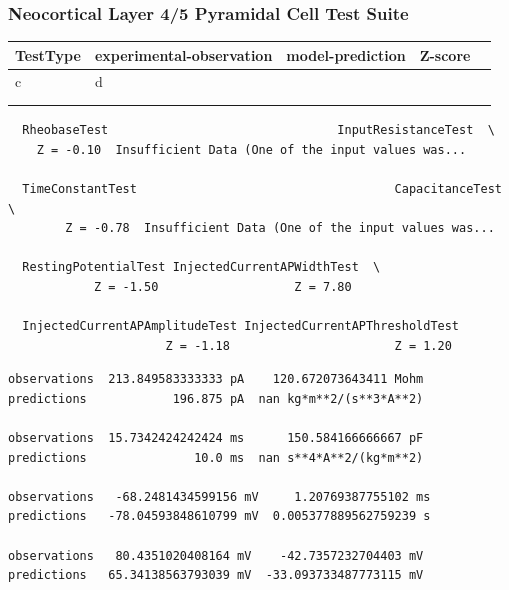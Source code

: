 \subsubsection{Neocortical Layer 4/5 Pyramidal Cell Test
Suite}\label{neocortical-layer-45-pyramidal-cell-test-suite}

\begin{table}[]
\begin{tabular}{|l|l|l|l|l|}
\hline
TestType & experimental-observation & model-prediction& Z-score &  \\ \hline
c & d &  &  &  \\ \hline
  &   &  &  &  \\ \hline
  &   &  &  &  \\ \hline
\end{tabular}
\end{table}    
    
    \begin{verbatim}
  RheobaseTest                                InputResistanceTest  \
    Z = -0.10  Insufficient Data (One of the input values was...   

  TimeConstantTest                                    CapacitanceTest  \
        Z = -0.78  Insufficient Data (One of the input values was...   

  RestingPotentialTest InjectedCurrentAPWidthTest  \
            Z = -1.50                   Z = 7.80   

  InjectedCurrentAPAmplitudeTest InjectedCurrentAPThresholdTest  
                      Z = -1.18                       Z = 1.20  
    \end{verbatim}

    
    
    \begin{verbatim}
observations  213.849583333333 pA    120.672073643411 Mohm   
predictions            196.875 pA  nan kg*m**2/(s**3*A**2)   

observations  15.7342424242424 ms      150.584166666667 pF   
predictions               10.0 ms  nan s**4*A**2/(kg*m**2)   

observations   -68.2481434599156 mV     1.20769387755102 ms   
predictions   -78.04593848610799 mV  0.005377889562759239 s   

observations   80.4351020408164 mV    -42.7357232704403 mV  
predictions   65.34138563793039 mV  -33.093733487773115 mV  
    \end{verbatim}

